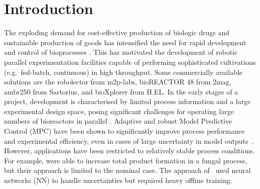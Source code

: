 \documentclass[final,5p,times,twocolumn,authoryear]{elsarticle}
\begin{document}
\section{Introduction}
\label{sec:introduction}
The exploding demand for cost-effective production of biologic drugs and sustainable production of goods has intensified the need for rapid development and control of bioprocesses \citep{rathore21:survey}. This has motivated the development of robotic parallel experimentation facilities capable of performing sophisticated cultivations (e.g.~fed-batch, continuous) in high throughput. Some commercially available solutions are the robolector from m2p-labs, bioREACTOR 48 from 2mag, ambr250 from Sartorius, and bioXplorer from H.EL.
%
In the early stages of a project, development is characterised by limited process information and a large experimental design space, posing significant challenges for operating large numbers of bioreactors in parallel \citep{cruz17:parallel}. Adaptive and robust Model Predictive Control (MPC) have been shown to significantly improve process performance and experimental efficiency, even in cases of large uncertainty in
model outputs~\citep{krausch22,rolf20:ampc,tuveri23:mhe}. However, applications have been restricted to relatively stable process conditions. For example, \citet{kager20} were able to increase total product formation in a fungal process, but their approach is limited to the nominal case. The approach of~\citet{mowbray22} used neural networks (NN) to handle uncertainties but required heavy offline training.

\end{document}
